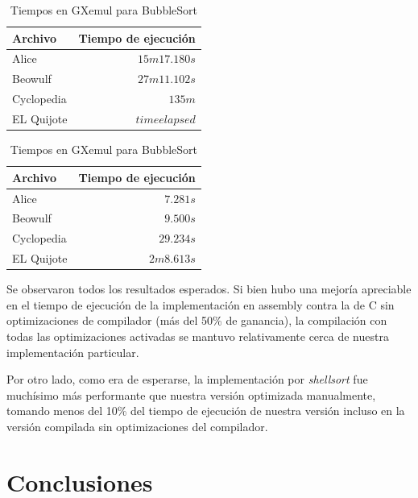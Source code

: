 \documentclass[a4paper,11pt]{article}
\begin{document}
\FloatBarrier

\begin{table}[h!t]
\centering
\begin{tabular}{ | l | r | }
  \hline
  Archivo          & Tiempo de ejecución \\ \hline
  Alice				 & \(15m 17.180s\) \\
  Beowulf     & \(27m 11.102s\) \\
  Cyclopedia     & \(135m\) \\
  EL Quijote      & \(time elapsed\) \\
  \hline
\end{tabular}
\caption{Tiempos en GXemul para BubbleSort}
\label{tab:resultados}
\end{table}

\FloatBarrier

\begin{table}[h!t]
\centering
\begin{tabular}{ | l | r | }
  \hline
  Archivo          & Tiempo de ejecución \\ \hline
  Alice				 & \(7.281s\) \\
  Beowulf     & \(9.500s\) \\
  Cyclopedia     & \(29.234s\) \\
  EL Quijote      & \(2m 8.613s\) \\
  \hline
\end{tabular}
\caption{Tiempos en GXemul para BubbleSort}
\label{tab:resultados}
\end{table}

\FloatBarrier

Se observaron todos los resultados esperados. Si bien hubo una mejoría
apreciable en el tiempo de ejecución de la implementación en assembly contra la
de C sin optimizaciones de compilador (más del 50\% de ganancia), la
compilación con todas las optimizaciones activadas se mantuvo relativamente
cerca de nuestra implementación particular.

Por otro lado, como era de esperarse, la implementación por \textit{shellsort}
fue muchísimo más performante que nuestra versión optimizada manualmente,
tomando menos del 10\% del tiempo de ejecución de nuestra versión incluso en la
versión compilada sin optimizaciones del compilador.

\section{Conclusiones}
\end{document}

